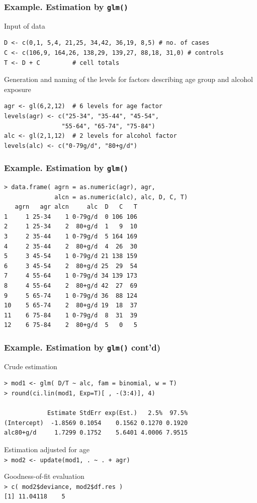\documentclass[handout,12pt]{beamer}
\begin{document}
\begin{frame}[fragile] 
\frametitle{Example. Estimation by {\tt glm()}}

Input of data
{\small
\begin{verbatim}
D <- c(0,1, 5,4, 21,25, 34,42, 36,19, 8,5) # no. of cases
C <- c(106,9, 164,26, 138,29, 139,27, 88,18, 31,0) # controls
T <- D + C         # cell totals
\end{verbatim}
}
Generation and naming of the levels for factors describing 
age group and alcohol exposure
{\small
\begin{verbatim}
agr <- gl(6,2,12)  # 6 levels for age factor
levels(agr) <- c("25-34", "35-44", "45-54", 
                "55-64", "65-74", "75-84")
alc <- gl(2,1,12)  # 2 levels for alcohol factor
levels(alc) <- c("0-79g/d", "80+g/d")
\end{verbatim}
}
\end{frame}

\begin{frame}[fragile]
\frametitle{Example. Estimation by {\tt glm()}}

{\small
\begin{verbatim}
> data.frame( agrn = as.numeric(agr), agr, 
              alcn = as.numeric(alc), alc, D, C, T)
   agrn   agr alcn     alc  D   C   T
1     1 25-34    1 0-79g/d  0 106 106
2     1 25-34    2  80+g/d  1   9  10
3     2 35-44    1 0-79g/d  5 164 169
4     2 35-44    2  80+g/d  4  26  30
5     3 45-54    1 0-79g/d 21 138 159
6     3 45-54    2  80+g/d 25  29  54
7     4 55-64    1 0-79g/d 34 139 173
8     4 55-64    2  80+g/d 42  27  69
9     5 65-74    1 0-79g/d 36  88 124
10    5 65-74    2  80+g/d 19  18  37
11    6 75-84    1 0-79g/d  8  31  39
12    6 75-84    2  80+g/d  5   0   5
\end{verbatim}
}

\end{frame}

\begin{frame}[fragile]
\frametitle{Example. Estimation by {\tt glm()} cont'd)}

Crude estimation
{\small
\begin{verbatim}
> mod1 <- glm( D/T ~ alc, fam = binomial, w = T)
> round(ci.lin(mod1, Exp=T)[ , -(3:4)], 4)

            Estimate StdErr exp(Est.)   2.5%  97.5%
(Intercept)  -1.8569 0.1054    0.1562 0.1270 0.1920
alc80+g/d     1.7299 0.1752    5.6401 4.0006 7.9515
\end{verbatim}
}

Estimation adjusted for age \\
{\small
\verb|> mod2 <- update(mod1, . ~ . + agr)|
} 

Goodness-of-fit evaluation \\
{\small
\verb|> c( mod2$deviance, mod2$df.res )|\\
\verb|[1] 11.04118    5|
}

\medskip

\end{frame}
\end{document}
